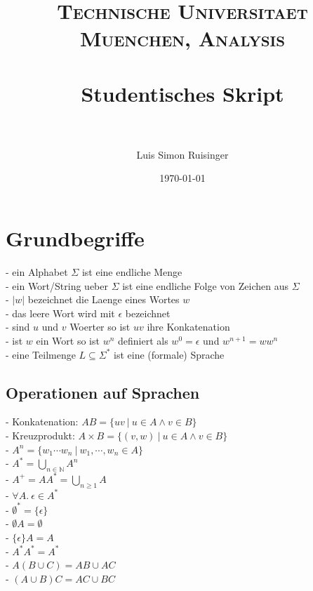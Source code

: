 \documentclass[paper=a4, fontsize=11pt]{scrartcl} %
\title{	
\normalfont \normalsize 
\textsc{Technische Universitaet Muenchen, Analysis} \\ [25pt] %
\horrule{0.5pt} \\[0.4cm] %
\huge Studentisches Skript \\ %
\horrule{2pt} \\[0.5cm] %
}
\author{Luis Simon Ruisinger} %
\date{\normalsize\today} %
\numberwithin{equation}{section} %
\numberwithin{figure}{section} %
\numberwithin{table}{section} %
\begin{document}
\maketitle %


\section{Grundbegriffe}

- ein Alphabet $\Sigma$ ist eine endliche Menge\\
- ein Wort/String ueber $\Sigma$ ist eine endliche Folge von Zeichen aus $\Sigma$\\
- $|w|$ bezeichnet die Laenge eines Wortes $w$\\
- das leere Wort wird mit $\epsilon$ bezeichnet\\
- sind $u$ und $v$ Woerter so ist $uv$ ihre Konkatenation\\
- ist $w$ ein Wort so ist $w^n$ definiert als $w^0=\epsilon$ und $w^{n+1}=ww^n$\\
- eine Teilmenge $L\subseteq\Sigma^*$ ist eine (formale) Sprache\\

\subsection{Operationen auf Sprachen}

- Konkatenation: $AB=\{uv\ |\ u\in A\wedge v\in B\}$\\
- Kreuzprodukt: $A\times B=\{(v,w)\ |\ u\in A\wedge v\in B\}$\\
- $A^n=\{w_1\cdots w_n\ |\ w_1,\cdots,w_n\in A\}$\\
- $A^*=\bigcup_{n\in\mathbb N}A^n$\\
- $A^+=AA^*=\bigcup_{n\ge 1}A$\\
- $\forall A.\ \epsilon\in A^*$\\
- $\emptyset^*=\{\epsilon\}$\\
- $\emptyset A=\emptyset$\\
- $\{\epsilon\}A=A$\\
- $A^*A^*=A^*$\\
- $A(B\cup C)=AB\cup AC$\\
- $(A\cup B)C=AC\cup BC$\\
\end{document}
